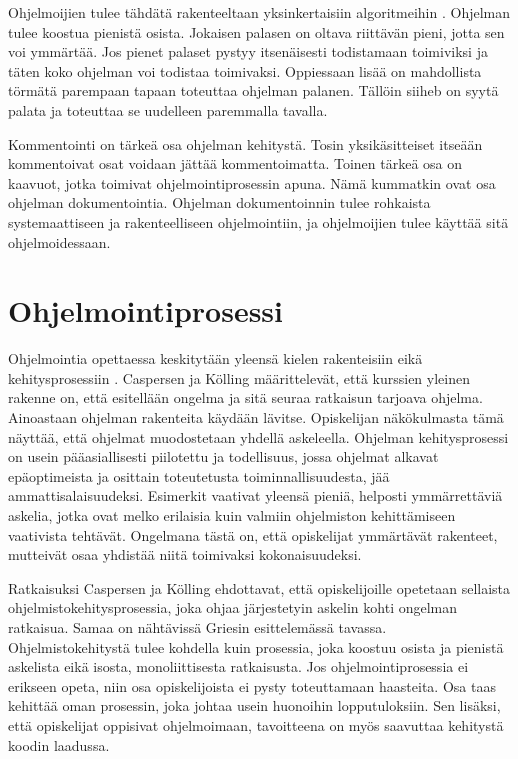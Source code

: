 \documentclass{tktltiki}
\begin{document}
Ohjelmoijien tulee tähdätä rakenteeltaan yksinkertaisiin algoritmeihin \cite{Gries:1974:WTI:953057.810447}. Ohjelman tulee koostua pienistä osista. Jokaisen palasen on oltava riittävän pieni, jotta sen voi ymmärtää. Jos pienet palaset pystyy itsenäisesti todistamaan toimiviksi ja täten koko ohjelman voi todistaa toimivaksi. Oppiessaan lisää on mahdollista törmätä parempaan tapaan toteuttaa ohjelman palanen. Tällöin siiheb on syytä palata ja toteuttaa se uudelleen paremmalla tavalla.

Kommentointi on tärkeä osa ohjelman kehitystä. Tosin yksikäsitteiset itseään kommentoivat osat voidaan jättää kommentoimatta. Toinen tärkeä osa on kaavuot, jotka toimivat ohjelmointiprosessin apuna. Nämä kummatkin ovat osa ohjelman dokumentointia. Ohjelman dokumentoinnin tulee rohkaista systemaattiseen ja rakenteelliseen ohjelmointiin, ja ohjelmoijien tulee käyttää sitä ohjelmoidessaan.

\section{Ohjelmointiprosessi}

Ohjelmointia opettaessa keskitytään yleensä kielen rakenteisiin eikä kehitysprosessiin \cite{Caspersen:2006:NPO:1176617.1176741,Vihavainen:2011:EAM:1953163.1953196}. Caspersen ja Kölling määrittelevät, että kurssien yleinen rakenne on, että esitellään ongelma ja sitä seuraa ratkaisun tarjoava ohjelma. Ainoastaan ohjelman rakenteita käydään lävitse. Opiskelijan näkökulmasta tämä näyttää, että ohjelmat muodostetaan yhdellä askeleella. Ohjelman kehitysprosessi on usein pääasiallisesti piilotettu ja todellisuus, jossa ohjelmat alkavat epäoptimeista ja osittain toteutetusta toiminnallisuudesta, jää ammattisalaisuudeksi. Esimerkit vaativat yleensä pieniä, helposti ymmärrettäviä askelia, jotka ovat melko erilaisia kuin valmiin ohjelmiston kehittämiseen vaativista tehtävät. Ongelmana tästä on, että opiskelijat ymmärtävät rakenteet, mutteivät osaa yhdistää niitä toimivaksi kokonaisuudeksi.

Ratkaisuksi Caspersen ja Kölling ehdottavat, että opiskelijoille opetetaan sellaista ohjelmistokehitysprosessia, joka ohjaa järjestetyin askelin kohti ongelman ratkaisua. Samaa on nähtävissä Griesin esittelemässä tavassa. Ohjelmistokehitystä tulee kohdella kuin prosessia, joka koostuu osista ja pienistä askelista eikä isosta, monoliittisesta ratkaisusta. Jos ohjelmointiprosessia ei erikseen opeta, niin osa opiskelijoista ei pysty toteuttamaan haasteita. Osa taas kehittää oman prosessin, joka johtaa usein huonoihin lopputuloksiin. Sen lisäksi, että opiskelijat oppisivat ohjelmoimaan, tavoitteena on myös saavuttaa kehitystä koodin laadussa.
\end{document}
